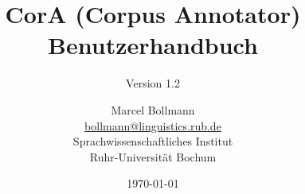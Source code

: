 \documentclass[11pt,a4paper,parskip=half]{scrartcl}
\begin{document}
\newcommand{\mmb}{Marcel Bollmann ({\small\url{bollmann@linguistics.rub.de}})}
\newcommand{\trans}[1]{"`{\small\texttt{#1}}"'}
\newcommand*\circled[1]{\tikz[baseline=(char.base)]{\node[shape=circle,draw,inner sep=1pt,fill=yellow] (char) {\small\textbf{#1}};}}


\newenvironment{infobox}[1]{
  \begin{mdframed}[linewidth=1,leftmargin=20,rightmargin=20,%
    backgroundcolor=Yellow!50,linecolor=GreenYellow,%
    splittopskip=\topskip,skipbelow=0.5\baselineskip,%
    skipabove=\baselineskip,%
    roundcorner=6pt,%
    innerleftmargin=6pt,innerrightmargin=6pt,%
    innerbottommargin=.85\baselineskip,innertopmargin=6pt]
    \textbf{#1}\\
}{
  \end{mdframed}
}

\newenvironment{alertbox}[1]{
  \begin{mdframed}[linewidth=1,leftmargin=20,rightmargin=20,%
    backgroundcolor=Red!45,linecolor=Sepia,%
    splittopskip=\topskip,skipbelow=0.5\baselineskip,%
    skipabove=\baselineskip,%
    roundcorner=6pt,%
    innerleftmargin=6pt,innerrightmargin=6pt,%
    innerbottommargin=.85\baselineskip,innertopmargin=6pt]
    \textbf{#1}\\
}{
  \end{mdframed}
}


\pagestyle{fancy}


\title{CorA (Corpus Annotator)\\Benutzerhandbuch}
\subtitle{Version 1.2} \author{Marcel
  Bollmann\\\url{bollmann@linguistics.rub.de}\\Sprachwissenschaftliches
  Institut\\Ruhr-Universität Bochum} \date{\today}
\maketitle

\tableofcontents
\newpage
\end{document}
